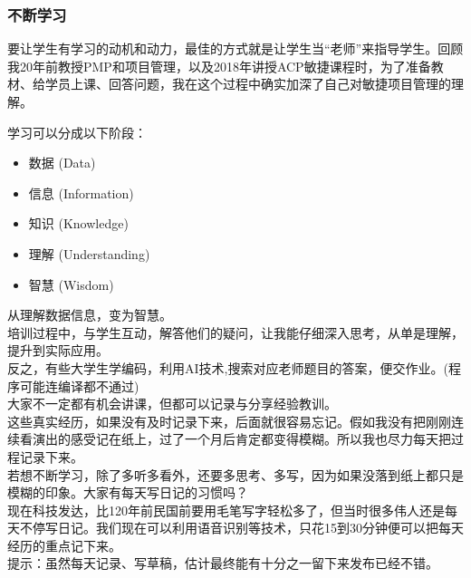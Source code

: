 \hypertarget{ux4e0dux65adux5b66ux4e60}{%
\subsubsection{不断学习}\label{ux4e0dux65adux5b66ux4e60}}

要让学生有学习的动机和动力，最佳的方式就是让学生当``老师''来指导学生。回顾我20年前教授PMP和项目管理，以及2018年讲授ACP敏捷课程时，为了准备教材、给学员上课、回答问题，我在这个过程中确实加深了自己对敏捷项目管理的理解。

学习可以分成以下阶段：

\begin{itemize}
\tightlist
\item
  数据 (Data)
\item
  信息 (Information)
\item
  知识 (Knowledge)
\item
  理解 (Understanding)
\item
  智慧 (Wisdom)
\end{itemize}

从理解数据信息，变为智慧。\\
培训过程中，与学生互动，解答他们的疑问，让我能仔细深入思考，从单是理解，提升到实际应用。\\
反之，有些大学生学编码，利用AI技术,搜索对应老师题目的答案，便交作业。(程序可能连编译都不通过)\\
大家不一定都有机会讲课，但都可以记录与分享经验教训。\\
这些真实经历，如果没有及时记录下来，后面就很容易忘记。假如我没有把刚刚连续看演出的感受记在纸上，过了一个月后肯定都变得模糊。所以我也尽力每天把过程记录下来。\\
若想不断学习，除了多听多看外，还要多思考、多写，因为如果没落到纸上都只是模糊的印象。大家有每天写日记的习惯吗？\\
现在科技发达，比120年前民国前要用毛笔写字轻松多了，但当时很多伟人还是每天不停写日记。我们现在可以利用语音识别等技术，只花15到30分钟便可以把每天经历的重点记下来。\\
提示：虽然每天记录、写草稿，估计最终能有十分之一留下来发布已经不错。



